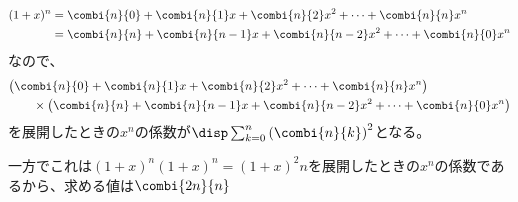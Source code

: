 \begin{align*}
 (1+x)^n &= \combi{n}{0}+\combi{n}{1}x+\combi{n}{2}x^2+\dots+\combi{n}{n}x^n \\
 &= \combi{n}{n}+\combi{n}{n-1}x+\combi{n}{n-2}x^2+\dots+\combi{n}{0}x^n
\end{align*}
なので、
\begin{align*}
 &\bigl(\combi{n}{0}+\combi{n}{1}x+\combi{n}{2}x^2+\dots+\combi{n}{n}x^n\bigr) \\
 &\qquad \times\bigl(\combi{n}{n}+\combi{n}{n-1}x+\combi{n}{n-2}x^2+\dots+\combi{n}{0}x^n\bigr)
\end{align*}
を展開したときの$x^n$の係数が$\disp \sum_{k=0}^n\left(\combi{n}{k}\right)^2$となる。

一方でこれは$(1+x)^n(1+x)^n=(1+x)^2n$を展開したときの$x^n$の係数であるから、求める値は$\combi{2n}{n}$